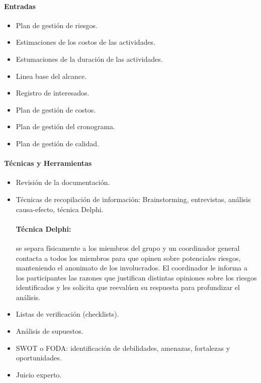 \documentclass[a4paper,twosides]{article}
\newlength{\wideitemsep}
\let\olditem\item
\renewcommand{\item}{\setlength{\itemsep}{\wideitemsep}\olditem}
\begin{document}
\paragraph{Entradas}
\begin{itemize}
\item Plan de gestión de riesgos.
\item Estimaciones de los costos de las actividades.
\item Estumaciones de la duración de las actividades.
\item Linea base del alcance.
\item Registro de interesados.
\item Plan de gestión de costos.
\item Plan de gestión del cronograma.
\item Plan de gestión de calidad.
\end{itemize}

\paragraph{Técnicas y Herramientas}
\begin{itemize}
\item Revisión de la documentación.
\item Técnicas de recopilación de información: Brainstorming, entrevistas, análisis causa-efecto, técnica Delphi.
\paragraph{Técnica Delphi:} se separa físicamente a los miembros del grupo y un coordinador general contacta a todos los miembros para que opinen sobre potenciales riesgos, manteniendo el anonimato de los involucrados. El coordinador le informa a los participantes las razones que justifican distintas opiniones sobre los riesgos identificados y les solicita que reevalúen su respuesta para profundizar el análisis.
\item Listas de verificación (checklists).
\item Análisis de supuestos.
\item SWOT o FODA: identificación de debilidades, amenazas, fortalezas y oportunidades.
\item Juicio experto.
\end{itemize}
\end{document}

